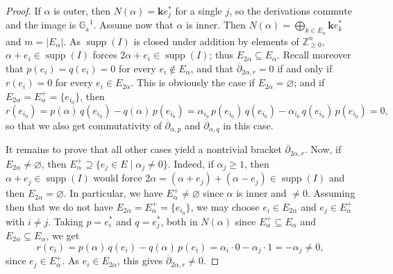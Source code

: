 \documentclass[11pt,letterpaper,reqno]{amsart}
\theoremstyle{remark}
\theoremstyle{definition}
\newcommand{\KK}[0]{\ensuremath{\mathbf{k}}}
\newcommand{\ZZ}[0]{\ensuremath{\mathbb{Z}}}
\newcommand{\GA}[0]{\ensuremath{\mathbb{G}_{\mathrm{a}}}}
\newcommand{\supp}[0]{\ensuremath{\operatorname{supp}}}
\begin{document}
\begin{proof}
If $\alpha$ is outer, then $N(\alpha)=\KK e_j^*$ for a single $j$, so the derivations commute and the image is $\GA^1$. Assume now that $\alpha$ is inner. Then $N(\alpha)=\bigoplus_{k\in E_\alpha}\KK e_k^*$ and $m=|E_\alpha|$. As $\supp(I)$ is closed under addition by elements of $\ZZ^n_{\geq 0}$, $\alpha+e_i\in\supp(I)$ forces $2\alpha+e_i\in\supp(I)$; thus
$E_{2\alpha}\subseteq E_{\alpha}$. Recall moreover that $p(e_i)=q(e_i)=0$ for every $e_i\not\in E_\alpha$, and that $\overline\partial_{2\alpha,r}=0$ if and only if
$r(e_i)=0$ for every $e_i\in E_{2\alpha}$. This is obviously the case if $E_{2\alpha}=\varnothing$; and if $E_{2\alpha}=E^+_\alpha=\{e_{i_0}\}$, then
\[r(e_{i_0})=p(\alpha)\,q(e_{i_0})-q(\alpha)\,p(e_{i_0})=\alpha_{i_0}\,p(e_{i_0})\,q(e_{i_0})-\alpha_{i_0}\,q(e_{i_0})\,p(e_{i_0})=0,\]
so that we also get commutativity of $\overline{\partial}_{\alpha,p}$ and $\overline{\partial}_{\alpha,q}$ in this case.

It remains to prove that all other cases yield a nontrivial bracket $\overline\partial_{2\alpha,r}$. Now, if $E_{2\alpha}\neq\varnothing$, then $E^+_\alpha\supseteq \{e_j\in E\mid \alpha_j\neq0\}$. Indeed, if $\alpha_j\geq 1$, then $\alpha+e_j\in\supp(I)$ would force $2\alpha=(\alpha+e_j)+(\alpha-e_j)\in\supp(I)$ and then $E_{2\alpha}=\varnothing$. In particular, we have $E_{\alpha}^+\neq\varnothing$ since $\alpha$ is inner and $\neq 0$. Assuming then that we do not have $E_{2\alpha}=E^+_\alpha=\{e_{i_0}\}$, we may choose $e_i\in E_{2\alpha}$ and $e_j\in E^+_\alpha$ with $i\neq j$. Taking $p=e_i^*$ and $q=e_{j}^*$, both in $N(\alpha)$ since $E^+_\alpha\subseteq E_\alpha$ and $E_{2\alpha}\subseteq E_\alpha$, we get
\[r(e_{i})=p(\alpha)\,q(e_{i})-q(\alpha)\,p(e_{i})=\alpha_i\cdot 0-\alpha_{j}\cdot 1=-\alpha_j\neq0,\]
since $e_j\in E^+_\alpha$. As $e_i\in E_{2\alpha}$, this gives $\overline\partial_{2\alpha,r}\neq 0$.
\end{proof}
\end{document}
